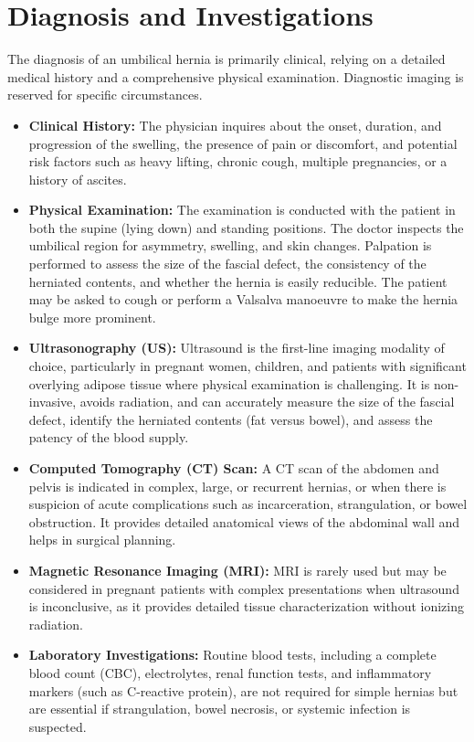 \section*{Diagnosis and Investigations}
The diagnosis of an umbilical hernia is primarily clinical, relying on a detailed medical history and a comprehensive physical examination. Diagnostic imaging is reserved for specific circumstances.
\begin{itemize}
    \item \textbf{Clinical History:} The physician inquires about the onset, duration, and progression of the swelling, the presence of pain or discomfort, and potential risk factors such as heavy lifting, chronic cough, multiple pregnancies, or a history of ascites.
    \item \textbf{Physical Examination:} The examination is conducted with the patient in both the supine (lying down) and standing positions. The doctor inspects the umbilical region for asymmetry, swelling, and skin changes. Palpation is performed to assess the size of the fascial defect, the consistency of the herniated contents, and whether the hernia is easily reducible. The patient may be asked to cough or perform a Valsalva manoeuvre to make the hernia bulge more prominent.
    \item \textbf{Ultrasonography (US):} Ultrasound is the first-line imaging modality of choice, particularly in pregnant women, children, and patients with significant overlying adipose tissue where physical examination is challenging. It is non-invasive, avoids radiation, and can accurately measure the size of the fascial defect, identify the herniated contents (fat versus bowel), and assess the patency of the blood supply.
    \item \textbf{Computed Tomography (CT) Scan:} A CT scan of the abdomen and pelvis is indicated in complex, large, or recurrent hernias, or when there is suspicion of acute complications such as incarceration, strangulation, or bowel obstruction. It provides detailed anatomical views of the abdominal wall and helps in surgical planning.
    \item \textbf{Magnetic Resonance Imaging (MRI):} MRI is rarely used but may be considered in pregnant patients with complex presentations when ultrasound is inconclusive, as it provides detailed tissue characterization without ionizing radiation.
    \item \textbf{Laboratory Investigations:} Routine blood tests, including a complete blood count (CBC), electrolytes, renal function tests, and inflammatory markers (such as C-reactive protein), are not required for simple hernias but are essential if strangulation, bowel necrosis, or systemic infection is suspected.
\end{itemize}

